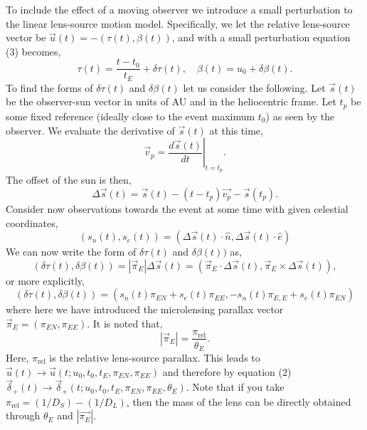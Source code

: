 \documentclass[11pt]{article}
\begin{document}
To include the effect of a moving observer we introduce a small perturbation to the linear
lens-source motion model. Specifically, we let the relative lens-source vector be 
$\vec{u}(t) = -(\tau(t),\beta(t))$, and with a small perturbation equation (3) becomes,
%
\begin{equation}
\tau(t) = \frac{t-t_{0}}{t_{E}}+\delta\tau(t), \quad \beta(t) =  u_{0}+\delta\beta(t).
\end{equation}
%
To find the forms of $\delta\tau(t)$ and $\delta\beta(t)$ let us consider the following.
Let $\vec{s}(t)$ be the observer-sun vector in units of AU and in the heliocentric frame. 
Let $t_{p}$ be some fixed reference (ideally close to the event maximum $t_{0}$) as seen 
by the observer. We evaluate the derivative of $\vec{s}(t)$ at this time,
%
\begin{equation}
\vec{v}_{p} =\left. \frac{d\vec{s}(t)}{dt}\right|_{t=t_{p}}.
\end{equation}
%
The offset of the sun is then,
%
\begin{equation}
\Delta\vec{s}(t) = \vec{s}(t)-(t-t_{p})\vec{v_{p}}-\vec{s}(t_{p}).
\end{equation}
%
Consider now observations towards the event at some time with given
celestial coordinates,
%
\begin{equation}
(s_{n}(t),s_{e}(t)) = (\Delta\vec{s}(t)\cdot\hat{n},\Delta\vec{s}(t)\cdot\hat{e})
\end{equation}
%
We can now write the form of $\delta\tau(t)$ and $\delta\beta(t))$ as,
%
\begin{equation}
(\delta\tau(t),\delta\beta(t)) = |\vec{\pi}_{E}|\Delta\vec{s}(t) = 
(\vec{\pi}_{E}\cdot\Delta\vec{s}(t),\vec{\pi}_{E}\times\Delta\vec{s}(t)),
\end{equation}
%
or more explicitly,
%
\begin{equation}
(\delta\tau(t),\delta\beta(t)) =  (s_{n}(t)\pi_{EN}+s_{e}(t)\pi_{EE},
                                  -s_{n}(t)\pi_{E,E}+s_{e}(t)\pi_{EN})
\end{equation}
%
where here we have introduced the microlensing parallax vector 
$\vec{\pi}_{E} = (\pi_{EN},\pi_{EE})$. It is noted that,
%
\begin{equation}
|\vec{\pi}_{E}| = \frac{\pi_{\text{rel}}}{\theta_{E}}.
\end{equation}
%
Here, $\pi_{\text{rel}}$ is the relative lens-source parallax. This leads to 
$\vec{u}(t) \to \vec{u}(t;u_{0},t_{0},t_{E},\pi_{EN},\pi_{EE})$ and therefore
by equation (2) $\vec{\delta}_{+}(t) \to \vec{\delta}_{+}(t;u_{0},t_{0},t_{E},\pi_{EN},\pi_{EE},\theta_{E})$.
Note that if you take $\pi_{\text{rel}}=(1/D_{S})-(1/D_{L})$, then the mass of the lens can be directly
obtained through $\theta_{E}$ and $|\vec{\pi_{E}}|$.
\end{document}
